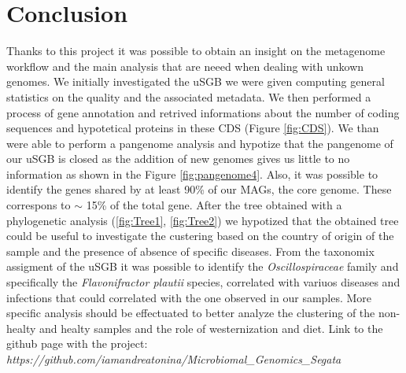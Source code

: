 \documentclass[a4paper,titlepage, oneside]{book}
\begin{document}
\chapter{Conclusion}
Thanks to this project it was possible to obtain an insight on the metagenome workflow and the main analysis that are neeed when dealing with unkown genomes.
We initially investigated the uSGB we were given computing general statistics on the quality and the associated metadata.
We then performed a process of gene annotation and retrived informations about the number of coding sequences and hypotetical proteins in these CDS (Figure \ref{fig:CDS}).
We than were able to perform a pangenome analysis and hypotize that the pangenome of our uSGB is closed as the addition of new genomes gives us little to no information as shown in the Figure \ref{fig:pangenome4}. Also, it was possible to identify the genes shared by at least 90\% of our MAGs, the core genome. These correspons to $\sim$ 15\% of the total gene.
After the tree obtained with a phylogenetic analysis (\ref{fig:Tree1}, \ref{fig:Tree2}) we hypotized that the obtained tree could be useful to investigate the custering based on the country of origin of the sample and the presence of absence of specific diseases.
From the taxonomix assigment of the uSGB it was possible to identify the \textit{Oscillospiraceae} family and specifically the \textit{Flavonifractor plautii} species, correlated with variuos diseases and infections \cite{HipJoint,PlautiiDiseases, PlautiiBlood} that could correlated with the one observed in our samples. More specific analysis should be effectuated to better analyze the clustering of the non-healty and healty samples and the role of westernization and diet.
\vfill
Link to the github page with the project: \textit{https://github.com/iamandreatonina/Microbiomal\_Genomics\_Segata}
\end{document}

